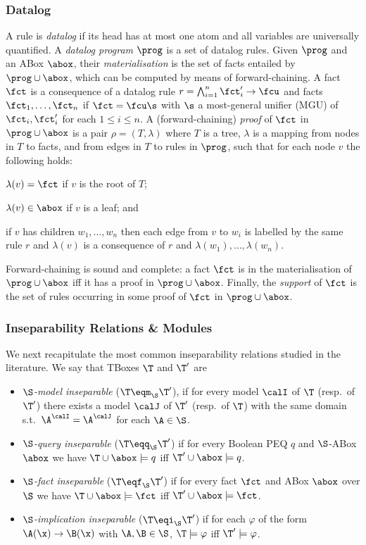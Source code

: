 \subsubsection{Datalog}
A rule is \emph{datalog} if its head has at most one atom
and all variables are universally quantified.
A \emph{datalog program} $\prog$ is a set of datalog rules.
Given $\prog$ and an ABox $\abox$, their
\emph{materialisation} is the
set of facts entailed by $\prog \cup \abox$, which
can be computed by means of forward-chaining. A fact $\fct$ is a consequence of a datalog rule 
$r=\bigwedge_{i=1}^n\fct'_i\to\fcu$ and facts
$\fct_1,\dots,\fct_n$ if $\fct = \fcu\s$  with $\s$
a most-general unifier (MGU) of $\fct_i,\fct'_i$ for each $1 \leq i \leq n$.
A (forward-chaining) \emph{proof}  
of $\fct$ in $\prog \cup \abox$  is a pair $\rho =
(T, \lambda)$ where $T$ is a tree, $\lambda$ is a mapping from 
nodes in $T$ to facts,
and from edges in $T$ to rules in $\prog$,
such that for each node $v$
the following holds:
\begin{inparaenum}
\item $\lambda(v) = \fct$ if $v$ is the root of $T$;
\item $\lambda(v) \in
\abox$ if $v$ is a leaf;
and  
\item if $v$ has children
$w_1,\dots,w_n$ then each edge from $v$
to $w_i$ is labelled by the same rule $r$ and
$\lambda(v)$ is a consequence of $r$
and $\lambda(w_1), \dots, \lambda(w_n)$.
\end{inparaenum}
Forward-chaining is sound and complete:
a fact $\fct$ is in the materialisation 
of $\prog\cup\abox$ iff it has a proof in
$\prog \cup \abox$.
Finally, the \emph{support} of  $\fct$ is
the set of rules occurring in some proof of
$\fct$ in $\prog \cup \abox$.


\subsubsection{Inseparability Relations \& Modules}
We next recapitulate the most common 
inseparability relations studied in the literature.
We say that 
TBoxes $\T$ and 
$\T'$ are 
%
\begin{itemize}
  \item \emph{$\S$-model inseparable} ($\T\eqm_{\S}\T'$), 
if for every model $\calI$ of $\T$ (resp.\ of $\T'$) 
there exists a model $\calJ$ of $\T'$ (resp.\ of $\T$) with the same domain
s.t.\ $\A^{\calI}=\A^{\calJ}$ for each $\A\in\S$.
 \item \emph{$\S$-query inseparable} ($\T\eqq_\S\T'$) if for every
    Boolean PEQ $q$ and $\S$-ABox $\abox$ we have
    $\T\cup\abox\models q$ iff $\T'\cup\abox\models q$.
 \item \emph{$\S$-fact inseparable} ($\T\eqf_{\S}\T'$) if for every
    fact $\fct$ and ABox $\abox$ over $\S$ we have $\T\cup\abox
    \models \fct$ iff $\T'\cup \abox\models \fct$.\qedhere
 \item \emph{$\S$-implication inseparable} ($\T\eqi_{\S}\T'$) if for
 each $\varphi$ of the form $\A(\x)\rightarrow\B(\x)$ with 
 $\A,\B\in\S$,  \hbox{$\T\models
    \varphi$} iff $\T'\models
  \varphi$.
\end{itemize}

